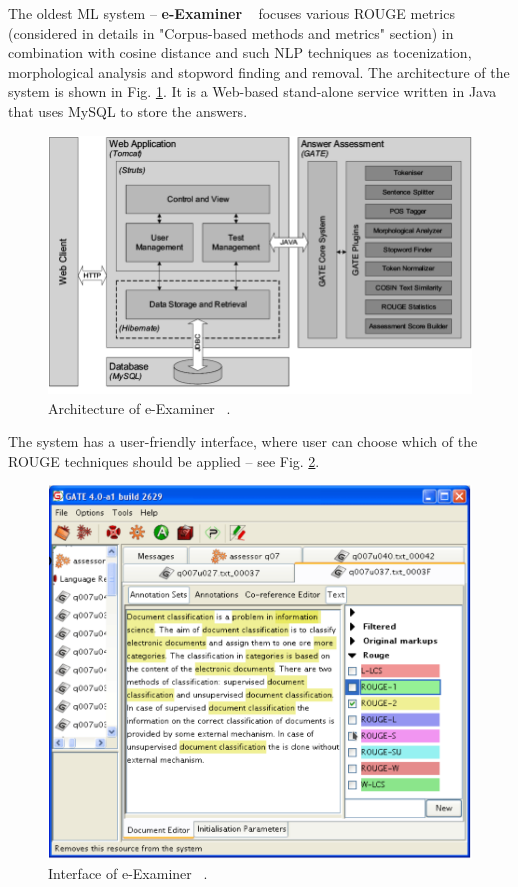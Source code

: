 The oldest ML system -- \textbf{e-Examiner} ~\cite{e-examiner} focuses various ROUGE metrics (considered in details in "Corpus-based methods and metrics" section) in combination with cosine distance and such NLP techniques as tocenization, morphological analysis and stopword finding and removal. The architecture of the system is shown in Fig. \ref{fig:e-examiner}. It is a  Web-based stand-alone service written in Java that uses MySQL to store the answers.\\


\begin{figure}[h!]
  \centering
  \includegraphics[width=\textwidth]{img/e-examiner}
    \caption{ Architecture of e-Examiner ~\cite{e-examiner}. }\label{fig:e-examiner}
\end{figure}

The system has a user-friendly interface, where user can choose which of the ROUGE techniques should be applied -- see Fig. \ref{fig:e-examiner_Interface}.\\

\begin{figure}[h!]
  \centering
  \includegraphics[width=\textwidth]{img/e-examiner_Interface}
    \caption{ Interface of e-Examiner ~\cite{e-examiner}. }\label{fig:e-examiner_Interface}
\end{figure}

